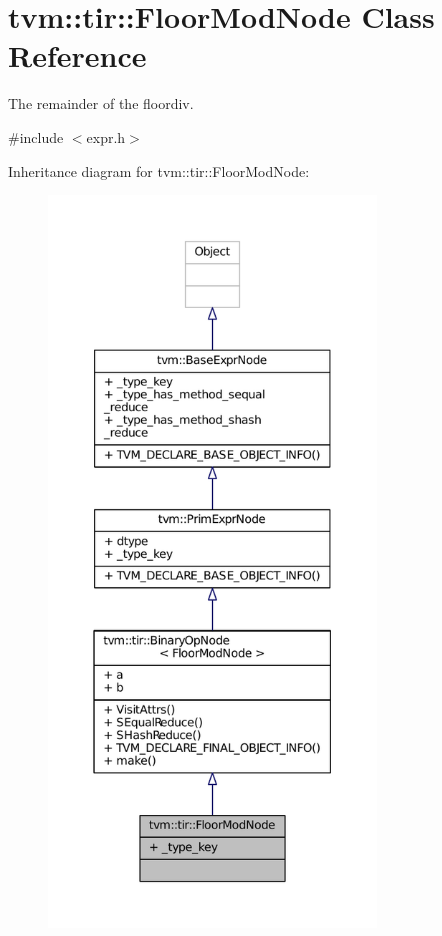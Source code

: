 \hypertarget{classtvm_1_1tir_1_1FloorModNode}{}\section{tvm\+:\+:tir\+:\+:Floor\+Mod\+Node Class Reference}
\label{classtvm_1_1tir_1_1FloorModNode}


The remainder of the floordiv.  




{\ttfamily \#include $<$expr.\+h$>$}



Inheritance diagram for tvm\+:\+:tir\+:\+:Floor\+Mod\+Node\+:
\nopagebreak
\begin{figure}[H]
\begin{center}
\leavevmode
\includegraphics[height=550pt]{classtvm_1_1tir_1_1FloorModNode__inherit__graph}
\end{center}
\end{figure}


